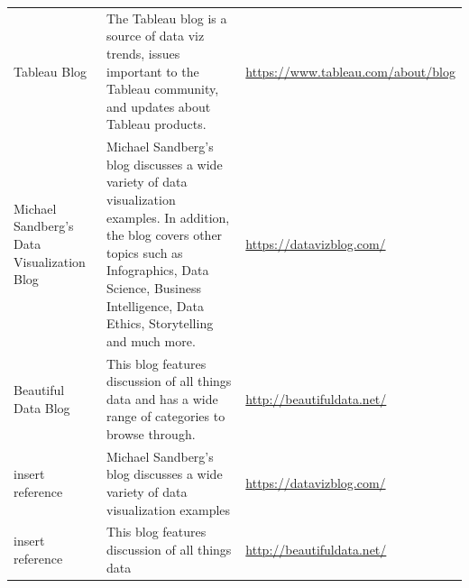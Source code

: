 \documentclass[]{book}
\begin{document}
\begin{longtable}[]{@{}lll@{}}
\begin{minipage}[t]{0.07\columnwidth}\raggedright
Tableau Blog\strut
\end{minipage} & \begin{minipage}[t]{0.77\columnwidth}\raggedright
The Tableau blog is a source of data viz trends, issues important to the Tableau community, and updates about Tableau products.\strut
\end{minipage} & \begin{minipage}[t]{0.07\columnwidth}\raggedright
\url{https://www.tableau.com/about/blog}\strut
\end{minipage}\tabularnewline
\begin{minipage}[t]{0.07\columnwidth}\raggedright
Michael Sandberg's Data Visualization Blog\strut
\end{minipage} & \begin{minipage}[t]{0.77\columnwidth}\raggedright
Michael Sandberg's blog discusses a wide variety of data visualization examples. In addition, the blog covers other topics such as Infographics, Data Science, Business Intelligence, Data Ethics, Storytelling and much more.\strut
\end{minipage} & \begin{minipage}[t]{0.07\columnwidth}\raggedright
\url{https://datavizblog.com/}\strut
\end{minipage}\tabularnewline
\begin{minipage}[t]{0.07\columnwidth}\raggedright
Beautiful Data Blog\strut
\end{minipage} & \begin{minipage}[t]{0.77\columnwidth}\raggedright
This blog features discussion of all things data and has a wide range of categories to browse through.\strut
\end{minipage} & \begin{minipage}[t]{0.07\columnwidth}\raggedright
\url{http://beautifuldata.net/}\strut
\end{minipage}\tabularnewline
\begin{minipage}[t]{0.07\columnwidth}\raggedright
insert reference\strut
\end{minipage} & \begin{minipage}[t]{0.77\columnwidth}\raggedright
Michael Sandberg's blog discusses a wide variety of data visualization examples\strut
\end{minipage} & \begin{minipage}[t]{0.07\columnwidth}\raggedright
\url{https://datavizblog.com/}\strut
\end{minipage}\tabularnewline
\begin{minipage}[t]{0.07\columnwidth}\raggedright
insert reference\strut
\end{minipage} & \begin{minipage}[t]{0.77\columnwidth}\raggedright
This blog features discussion of all things data\strut
\end{minipage} & \begin{minipage}[t]{0.07\columnwidth}\raggedright
\url{http://beautifuldata.net/}\strut
\end{minipage}\tabularnewline
\bottomrule
\end{longtable}
\end{document}
